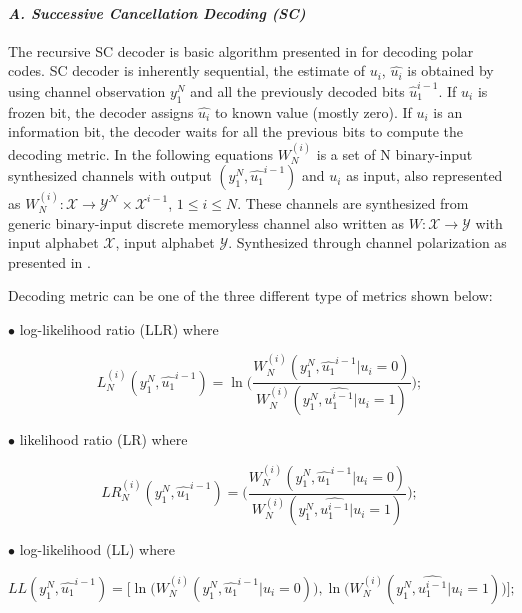 \paragraph{\emph{A. Successive Cancellation Decoding (SC)}}  \label{SC}
The recursive SC decoder is basic algorithm presented in \cite{Arikan} for decoding polar codes.  SC decoder is inherently sequential, the estimate of $u_{i}$, $\hat{u_{i}}$ is obtained by using channel observation $y^{N}_{1}$ and all the previously decoded bits $\hat{u}_{1}^{i-1}$. If $u_{i}$ is frozen bit, the decoder assigns $\hat{u_{i}}$ to known value (mostly zero). If $u_{i}$ is an information bit, the decoder waits for all the previous bits to compute the decoding metric.  In the following equations $W_{N}^{(i)}$ is a set of N binary-input synthesized channels with output $(y_{1}^{N},\hat{u_{1}}^{i-1})$ and $ u_{i} $ as input, also represented as $W_{N}^{(i)}:\mathcal{X}\to \mathcal{Y^N} \times \mathcal{X}^{i-1}$, $1 \leq i \leq N$. These channels are synthesized from generic binary-input discrete memoryless channel also written as $W:\mathcal{X}\to \mathcal{Y}$ with input alphabet $\mathcal{X}$, input alphabet $\mathcal{Y}$. Synthesized through channel polarization as presented in \cite{Arikan}.  \newline

Decoding metric can be one of the three different type of metrics shown below:

$\bullet$ log-likelihood ratio (LLR) where

\begin{equation}
L_{N}^{(i)}(y_{1}^{N},\hat{u_{1}}^{i-1}) = \ln{\Bigg(\frac{W_{N}^{(i)}(y_{1}^{N},\hat{u_{1}}^{i-1}|u_{i} = 0)} {W_{N}^{(i)}(y_{1}^{N},\hat{u_{1}^{i-1}}|u_{i} = 1)}\Bigg)};
\end{equation}

$\bullet$ likelihood ratio (LR) where 

\begin{equation}
LR_{N}^{(i)}(y_{1}^{N},\hat{u_{1}}^{i-1}) = \Bigg(\frac{W_{N}^{(i)}(y_{1}^{N},\hat{u_{1}}^{i-1}|u_{i} = 0)} {W_{N}^{(i)}(y_{1}^{N},\hat{u_{1}^{i-1}}|u_{i} = 1)}\Bigg);
\end{equation}

$\bullet$ log-likelihood (LL) where 

\begin{equation}
LL(y_{1}^{N},\hat{u_{1}}^{i-1}) = \Big[\ln\Big(W_{N}^{(i)}(y_{1}^{N},\hat{u_{1}}^{i-1}|u_{i} = 0)\Big), \ln\Big(W_{N}^{(i)}(y_{1}^{N},\hat{u_{1}^{i-1}}|u_{i} = 1)\Big)\Big];
\end{equation}

